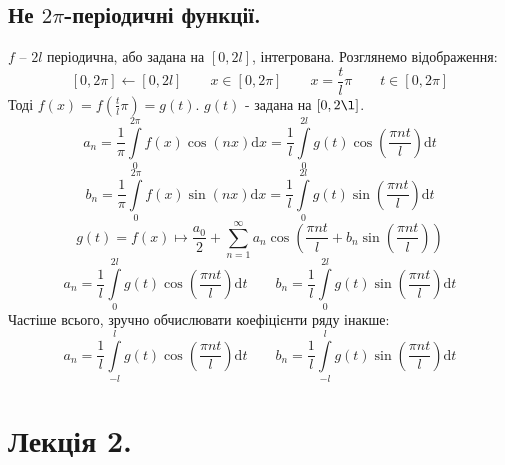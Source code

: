 \documentclass[a4paper]{scrartcl}
\theoremstyle{definition}
\theoremstyle{remark}
\theoremstyle{definition}
\theoremstyle{definition}
\begin{document}
\subsection{Не $2\pi$-періодичні функції.}
$f$  -- $2l$ періодична, або задана на $[0, 2l]$, інтегрована. Розглянемо відображення:
$$
[0, 2\pi] \leftarrow [0, 2l] \qquad x \in [0, 2\pi] \qquad x = \frac{t}{l}\pi \qquad t\in [0, 2\pi]
$$
Тоді $f(x) = f( \frac{t}{l}\pi ) = g(t)$. $g(t)$ - задана на $[0, 2\l]$.
$$
a_n = \frac{1}{\pi}  \int\limits_{0}^{2\pi}{ f(x) \cos{(nx)} \mathrm{d} x } =   \frac{1
}{l }  \int\limits_{0}^{2l}{ g(t) \cos{ \left( \frac{\pi n t}{l}  \right)} \mathrm{d} t}
$$
$$
b_n = \frac{1}{\pi}  \int\limits_{0}^{2\pi}{ f(x) \sin{(nx)} \mathrm{d} x } =   \frac{1
}{l }  \int\limits_{0}^{2l}{ g(t) \sin{ \left( \frac{\pi n t}{l}  \right)} \mathrm{d} t}
$$
$$
g(t) = f(x) \mapsto \frac{a_0}{2} +  \sum\limits_{n = 1}^{ \infty}{a_n \cos{ \left(  \frac{\pi n t}{l} + b_n\sin{ \left( \frac{\pi n t}{l}  \right)}   \right)}}
$$
$$
a_n =\frac{1
}{l }  \int\limits_{0}^{2l}{ g(t) \cos{ \left( \frac{\pi n t}{l}  \right)} \mathrm{d} t}
 \qquad b_n = \frac{1
}{l }  \int\limits_{0}^{2l}{ g(t) \sin{ \left( \frac{\pi n t}{l}  \right)} \mathrm{d} t}
$$
Частіше всього, зручно обчислювати коефіцієнти ряду інакше:
$$
a_n =\frac{1
}{l }  \int\limits_{-l}^{l}{ g(t) \cos{ \left( \frac{\pi n t}{l}  \right)} \mathrm{d} t}
 \qquad b_n = \frac{1
}{l }  \int\limits_{-l}^{l}{ g(t) \sin{ \left( \frac{\pi n t}{l}  \right)} \mathrm{d} t}
$$
\newpage
\section{Лекція 2.}
\end{document}
